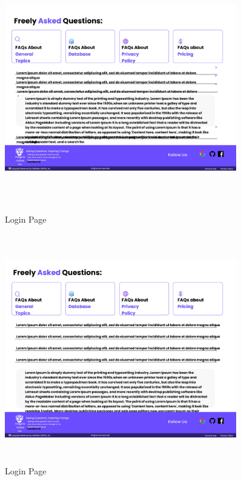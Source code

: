 \begin{figure}[H]
\pagebreak

\includegraphics[height=10cm, width=0.9\textwidth]{./images/prototype/0020}
\centering 
\caption{Login Page}
\label{fig:prototype1}

\includegraphics[height=10cm, width=0.9\textwidth]{./images/prototype/0021}
\centering 
\caption{Login Page}
\label{fig:prototype1}

\end{figure}